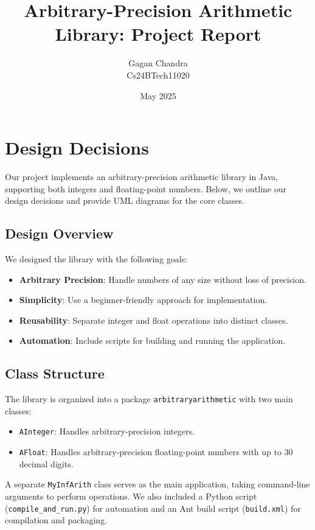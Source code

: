 \documentclass[a4paper,12pt]{article}
\title{Arbitrary-Precision Arithmetic Library: Project Report}
\author{
   Gagan Chandra \\
   Cs24BTech11020
}
\date{May 2025}
\begin{document}
\maketitle
\tableofcontents
\newpage

\section{Design Decisions}
Our project implements an arbitrary-precision arithmetic library in Java, supporting both integers and floating-point numbers. Below, we outline our design decisions and provide UML diagrams for the core classes.

\subsection{Design Overview}
We designed the library with the following goals:
\begin{itemize}
    \item \textbf{Arbitrary Precision}: Handle numbers of any size without loss of precision.
    \item \textbf{Simplicity}: Use a beginner-friendly approach for implementation.
    \item \textbf{Reusability}: Separate integer and float operations into distinct classes.
    \item \textbf{Automation}: Include scripts for building and running the application.
\end{itemize}

\subsection{Class Structure}
The library is organized into a package \texttt{arbitraryarithmetic} with two main classes:
\begin{itemize}
    \item \texttt{AInteger}: Handles arbitrary-precision integers.
    \item \texttt{AFloat}: Handles arbitrary-precision floating-point numbers with up to 30 decimal digits.
\end{itemize}
A separate \texttt{MyInfArith} class serves as the main application, taking command-line arguments to perform operations. We also included a Python script (\texttt{compile\_and\_run.py}) for automation and an Ant build script (\texttt{build.xml}) for compilation and packaging.
\end{document}
